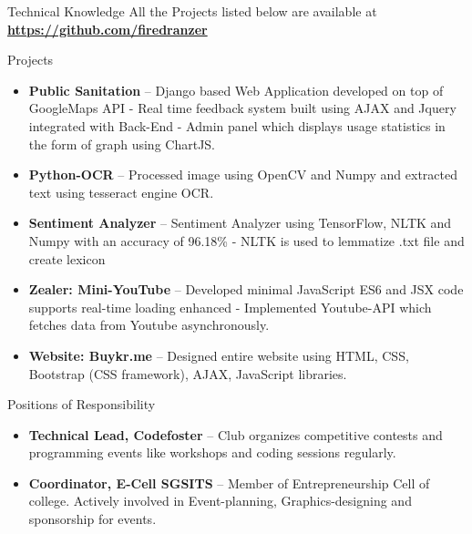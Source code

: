 \documentclass[]{mcdowellcv}
\begin{document}
	\begin{cvsection}{Technical Knowledge}{}{}
	All the Projects listed below are available at     \textbf{\url{https://github.com/firedranzer}}   \\     \begin{cvsubsection}{Projects}{}{}
			\begin{itemize}
			    
			    \item \textbf{Public Sanitation} -- Django based Web Application developed on top of GoogleMaps API - Real time feedback system built using AJAX and Jquery integrated with Back-End - Admin panel which displays usage statistics in the form of graph using ChartJS.
			    
				\item \textbf{Python-OCR} -- Processed image using OpenCV and Numpy and extracted text using tesseract engine OCR.
				
	    		\item \textbf{Sentiment Analyzer} -- Sentiment Analyzer using TensorFlow, NLTK and Numpy with an accuracy of 96.18\% - NLTK is used to lemmatize .txt file and create lexicon 
			    
			    \item \textbf{Zealer: Mini-YouTube} -- Developed minimal JavaScript ES6 and JSX code supports real-time loading enhanced - Implemented Youtube-API which fetches data from Youtube asynchronously.
			    
			    \item \textbf{Website: Buykr.me} -- Designed entire website using HTML, CSS, Bootstrap (CSS framework), AJAX, JavaScript libraries.
			\end{itemize}
		\end{cvsubsection}
	\end{cvsection}
	
	\begin{cvsection}{Positions of Responsibility}
		\begin{cvsubsection}{}{}{}	
			\begin{itemize}
				\item \textbf{Technical Lead, Codefoster} -- Club organizes competitive contests and programming events like workshops and coding sessions regularly.
			    \item \textbf{Coordinator, E-Cell SGSITS} -- Member of Entrepreneurship Cell of college. Actively involved in Event-planning, Graphics-designing and sponsorship for events.
			\end{itemize}
		\end{cvsubsection}
	\end{cvsection}
	
\end{document}
